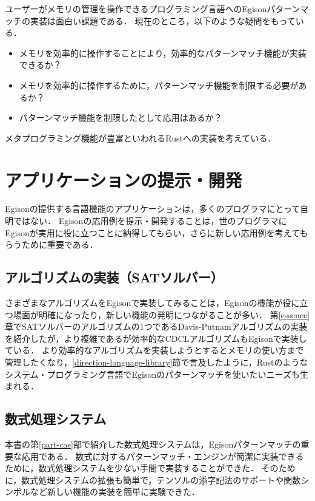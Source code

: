 ユーザーがメモリの管理を操作できるプログラミング言語へのEgisonパターンマッチの実装は面白い課題である．
現在のところ，以下のような疑問をもっている．
\begin{itemize}
\item メモリを効率的に操作することにより，効率的なパターンマッチ機能が実装できるか？
\item メモリを効率的に操作するために，パターンマッチ機能を制限する必要があるか？
\item パターンマッチ機能を制限したとして応用はあるか？
\end{itemize}
メタプログラミング機能が豊富といわれるRustへの実装を考えている．

\section{アプリケーションの提示・開発}\label{application}

Egisonの提供する言語機能のアプリケーションは，多くのプログラマにとって自明ではない．
Egisonの応用例を提示・開発することは，世のプログラマにEgisonが実用に役に立つことに納得してもらい，さらに新しい応用例を考えてもらうために重要である．

\subsection{アルゴリズムの実装（SATソルバー）}

さまざまなアルゴリズムをEgisonで実装してみることは，Egisonの機能が役に立つ場面が明確になったり，新しい機能の発明につながることが多い．
第\ref{essence}章でSATソルバーのアルゴリズムの1つであるDavis-Putnamアルゴリズムの実装を紹介したが，より複雑であるが効率的なCDCLアルゴリズムもEgisonで実装している．
より効率的なアルゴリズムを実装しようとするとメモリの使い方まで管理したくなり，\ref{direction-language-library}節で言及したように，Rustのようなシステム・プログラミング言語でEgisonのパターンマッチを使いたいニーズも生まれる．

\subsection{数式処理システム}

本書の第\ref{part-cas}部で紹介した数式処理システムは，Egisonパターンマッチの重要な応用である．
数式に対するパターンマッチ・エンジンが簡潔に実装できるために，数式処理システムを少ない手間で実装することができた．
そのために，数式処理システムの拡張も簡単で，テンソルの添字記法のサポートや関数シンボルなど新しい機能の実装を簡単に実験できた．

